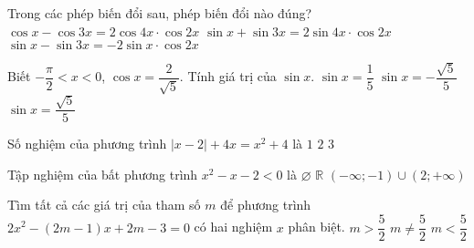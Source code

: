 \begin{ex}%
Trong các phép biến đổi sau, phép biến đổi nào đúng?
{$\cos x-\cos 3x=2\cos 4x\cdot\cos 2x$}
{$\sin x+\sin 3x=2\sin 4x\cdot \cos 2x$}
{\True $\sin x-\sin 3x=-2\sin x\cdot \cos 2x$}
\end{ex}

\begin{ex}%
Biết $-\dfrac{\pi}{2}<x<0$, $\cos x=\dfrac{2}{\sqrt{5}}$. Tính giá trị của $\sin x$.
{$\sin x=\dfrac{1}{5}$}
{\True $\sin x=-\dfrac{\sqrt{5}}{5}$}
{$\sin x=\dfrac{\sqrt{5}}{5}$}
\end{ex}

\begin{ex}%
Số nghiệm của phương trình $|x-2|+4x=x^2+4$ là
{$1$}
{$2$}
{\True $3$}
\end{ex}

\begin{ex}%
Tập nghiệm của bất phương trình $x^2-x-2<0$ là
{$\varnothing$}
{$\mathbb{R}$}
{$(-\infty;-1)\cup(2;+\infty)$}
\end{ex}

\begin{ex}%
Tìm tất cả các giá trị của tham số $m$ để phương trình $2x^2-(2m-1)x+2m-3=0$ có hai nghiệm $x$ phân biệt.
{$m>\dfrac{5}{2}$}
{\True $m\neq \dfrac{5}{2}$}
{$m<\dfrac{5}{2}$}
\end{ex}

